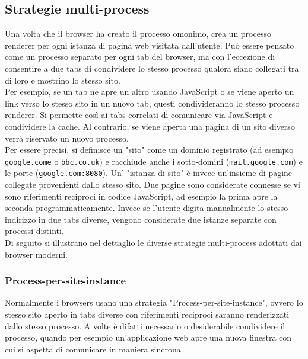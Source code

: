 \subsection{Strategie multi-process}

Una volta che il browser ha creato il processo omonimo, crea un processo renderer per ogni istanza di pagina web visitata dall'utente. Può essere pensato come un processo separato per ogni tab del browser, ma con l'eccezione di consentire a due tabs di condividere lo stesso processo qualora siano collegati tra di loro e mostrino lo stesso sito. \\

Per esempio, se un tab ne apre un altro usando JavaScript o se viene aperto un link verso lo stesso sito in un nuovo tab, questi condivideranno lo stesso processo renderer. Si permette così ai tabs correlati di comunicare via JavaScript e condividere la cache. Al contrario, se viene aperta una pagina di un sito diverso verrà riservato un nuovo processo. \\

Per essere precisi, si definisce un "sito" come un dominio registrato (ad esempio \texttt{google.come} o \texttt{bbc.co.uk}) e racchiude anche i sotto-domini (\texttt{mail.google.com}) e le porte (\texttt{google.com:8080}). Un' "istanza di sito" è invece un'insieme di pagine collegate provenienti dallo stesso sito. Due pagine sono considerate connesse se vi sono riferimenti reciproci in codice JavaScript, ad esempio la prima apre la seconda programmaticamente. Invece se l'utente digita manualmente lo stesso indirizzo in due tabs diverse, vengono considerate due istanze separate con processi distinti. \\

Di seguito si illustrano nel dettaglio le diverse strategie multi-process adottati dai browser moderni.

\subsubsection{Process-per-site-instance}

Normalmente i browsers usano una strategia "Process-per-site-instance", ovvero lo stesso sito aperto in tabs diverse con riferimenti reciproci saranno renderizzati dallo stesso processo. A volte è difatti necessario o desiderabile condividere il processo, quando per esempio un'applicazione web apre una nuova finestra con cui si aspetta di comunicare in maniera sincrona. \\

